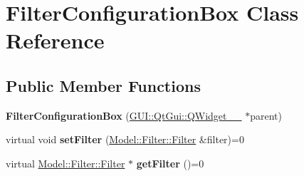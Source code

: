 \hypertarget{classGUI_1_1FilterConfigurationBox}{}\section{Filter\+Configuration\+Box Class Reference}
\label{classGUI_1_1FilterConfigurationBox}
\subsection*{Public Member Functions}
\begin{DoxyCompactItemize}
\item 
\hypertarget{classGUI_1_1FilterConfigurationBox_a6a57ffa28581a9be2e1c5f0eadca0ea7}{}{\bfseries Filter\+Configuration\+Box} (\hyperlink{classGUI_1_1QtGui_1_1QWidget____10}{G\+U\+I\+::\+Qt\+Gui\+::\+Q\+Widget\+\_\+\+\_} $\ast$parent)\label{classGUI_1_1FilterConfigurationBox_a6a57ffa28581a9be2e1c5f0eadca0ea7}

\item 
\hypertarget{classGUI_1_1FilterConfigurationBox_a6df3c7ee5f5662ce9fc15c681b42ba7f}{}virtual void {\bfseries set\+Filter} (\hyperlink{classModel_1_1Filter_1_1Filter}{Model\+::\+Filter\+::\+Filter} \&filter)=0\label{classGUI_1_1FilterConfigurationBox_a6df3c7ee5f5662ce9fc15c681b42ba7f}

\item 
\hypertarget{classGUI_1_1FilterConfigurationBox_a4e5cd34e624f1e0432ae4ba34a05d5db}{}virtual \hyperlink{classModel_1_1Filter_1_1Filter}{Model\+::\+Filter\+::\+Filter} $\ast$ {\bfseries get\+Filter} ()=0\label{classGUI_1_1FilterConfigurationBox_a4e5cd34e624f1e0432ae4ba34a05d5db}

\end{DoxyCompactItemize}

